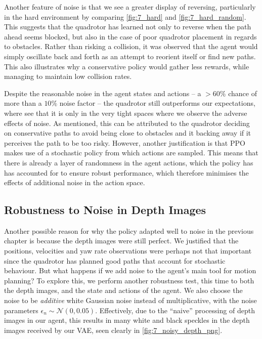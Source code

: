 Another feature of noise is that we see a greater display of reversing, particularly in the hard environment by comparing \cref{fig:7_hard} and \cref{fig:7_hard_random}. This suggests that the quadrotor has learned not only to reverse when the path ahead seems blocked, but also in the case of poor quadrotor placement in regards to obstacles. Rather than risking a collision, it was observed that the agent would simply oscillate back and forth as an attempt to reorient itself or find new paths. This also illustrates why a conservative policy would gather less rewards, while managing to maintain low collision rates.

Despite the reasonable noise in the agent states and actions -- a $>60\%$ chance of more than a $10\%$ noise factor -- the quadrotor still outperforms our expectations, where see that it is only in the very tight spaces where we observe the adverse effects of noise. As mentioned, this can be attributed to the quadrotor deciding on conservative paths to avoid being close to obstacles and it backing away if it perceives the path to be too risky. However, another justification is that PPO makes use of a stochastic policy from which actions are sampled. This means that there is already a layer of randomness in the agent actions, which the policy has has accounted for to ensure robust performance, which therefore minimises the effects of additional noise in the action space.


\subsection{Robustness to Noise in Depth Images}
Another possible reason for why the policy adapted well to noise in the previous chapter is because the depth images were still perfect. We justified that the positions, velocities and yaw rate observations were perhaps not that important since the quadrotor has planned good paths that account for stochastic behaviour. But what happens if we add noise to the agent's main tool for motion planning? To explore this, we perform another robustness test, this time to both the depth images, and the state and actions of the agent. We also choose the noise to be \textit{additive} white Gaussian noise instead of multiplicative, with the noise parameters $\epsilon_n \sim \mathcal{N}(0, 0.05)$. Effectively, due to the ``naive'' processing of depth images in our agent, this results in many white and black speckles in the depth images received by our VAE, seen clearly in \cref{fig:7_noisy_depth_png}.

